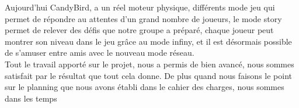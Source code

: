 \documentclass [11pt]{report}
\begin{document}
	Aujourd'hui CandyBird, a un r\'eel moteur physique, diff\'erents mode jeu qui permet de r\'epondre au attentes d'un grand nombre de joueurs, le mode story permet de relever des d\'efis que notre groupe a pr\'epar\'e, chaque joueur peut montrer son niveau dans le jeu gr\^ace au mode infiny, et il est d\'esormais possible de s'amuser entre amis avec le nouveau mode r\'eseau.\\
	
	Tout le travail apport\'e sur le projet, nous a permis de bien avanc\'e, nous sommes satisfait par le r\'esultat que tout cela donne. De plus quand nous faisons le point sur le planning que nous avons \'etabli dans le cahier des charges, nous sommes dans les temps 
\end{document}
